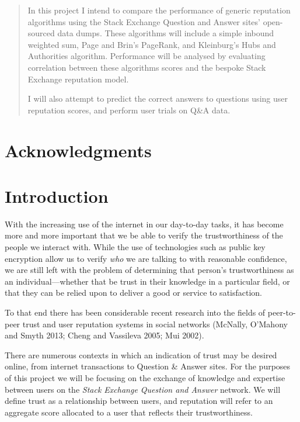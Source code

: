 \documentclass[]{final_report}
\begin{document}
\begin{abstract}

In this project I intend to compare the performance of generic reputation algorithms using the Stack Exchange Question and Answer sites' open-sourced data dumps. These algorithms will include a simple inbound weighted sum, Page and Brin's PageRank, and Kleinburg's Hubs and Authorities algorithm. Performance will be analysed by evaluating correlation between these algorithms scores and the bespoke Stack Exchange reputation model.

I will also attempt to predict the correct answers to questions using user reputation scores, and perform user trials on Q\&A data.

\end{abstract}
\newpage

\chapter*{Acknowledgments}


\chapter{Introduction}

With the increasing use of the internet in our day-to-day tasks, it has become more and more important that we be able to verify the trustworthiness of the people we interact with. While the use of technologies such as public key encryption allow us to verify \textsl{who} we are talking to with reasonable confidence, we are still left with the problem of determining that person's trustworthiness as an individual---whether that be trust in their knowledge in a particular field, or that they can be relied upon to deliver a good or service to satisfaction.

To that end there has been considerable recent research into the fields of peer-to-peer trust and user reputation systems in social networks (McNally, O'Mahony and Smyth 2013; Cheng and Vassileva 2005; Mui 2002).

There are numerous contexts in which an indication of trust may be desired online, from internet transactions to Question \& Answer sites. For the purposes of this project we will be focusing on the exchange of knowledge and expertise between users on the \textsl{Stack Exchange Question and Answer} network. We will define trust as a relationship between users, and reputation will refer to an aggregate score allocated to a user that reflects their trustworthiness.
\end{document}
